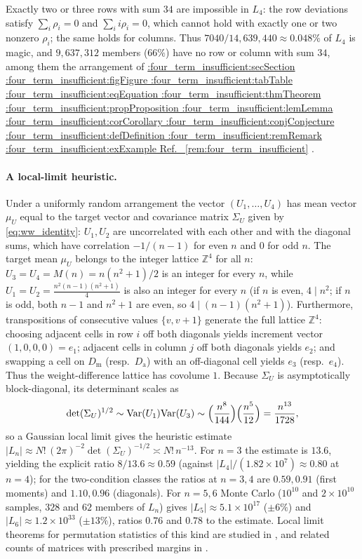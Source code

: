 \documentclass[11pt,a4paper]{article}
\makeatletter
\def\Cref@getprefix#1:#2\relax{#1}
\def\Cref@prefix@sec{sec}
\def\Cref@prefix@fig{fig}
\def\Cref@prefix@tab{tab}
\def\Cref@prefix@eq{eq}
\def\Cref@prefix@thm{thm}
\def\Cref@prefix@prop{prop}
\def\Cref@prefix@lem{lem}
\def\Cref@prefix@cor{cor}
\def\Cref@prefix@conj{conj}
\def\Cref@prefix@def{def}
\def\Cref@prefix@rem{rem}
\def\Cref@prefix@ex{ex}
\def\Cref@type@cap#1{%
  \edef\Cref@tmp{#1}%
  \ifx\Cref@tmp\Cref@prefix@sec Section%
  \else\ifx\Cref@tmp\Cref@prefix@fig Figure%
  \else\ifx\Cref@tmp\Cref@prefix@tab Table%
  \else\ifx\Cref@tmp\Cref@prefix@eq Equation%
  \else\ifx\Cref@tmp\Cref@prefix@thm Theorem%
  \else\ifx\Cref@tmp\Cref@prefix@prop Proposition%
  \else\ifx\Cref@tmp\Cref@prefix@lem Lemma%
  \else\ifx\Cref@tmp\Cref@prefix@cor Corollary%
  \else\ifx\Cref@tmp\Cref@prefix@conj Conjecture%
  \else\ifx\Cref@tmp\Cref@prefix@def Definition%
  \else\ifx\Cref@tmp\Cref@prefix@rem Remark%
  \else\ifx\Cref@tmp\Cref@prefix@ex Example%
  \else Ref.%
  \fi\fi\fi\fi\fi\fi\fi\fi\fi\fi\fi\fi
}
\DeclareRobustCommand{\Cref}[1]{%
  \begingroup
  \edef\Cref@label{#1}%
  \edef\Cref@prefix{\expandafter\Cref@getprefix\Cref@label:\relax}%
  \hyperref[#1]{\Cref@type@cap{\Cref@prefix}~\ref*{#1}}%
  \endgroup
}
\theoremstyle{plain}
\theoremstyle{definition}
\theoremstyle{remark}
\newcommand{\Z}{\mathbb{Z}}
\newcommand{\Var}{\mathrm{Var}}
\makeatother
\begin{document}
Exactly two or three rows with sum $34$ are impossible in $L_4$: the row deviations satisfy $\sum_i\rho_i=0$ and $\sum_ii\rho_i=0$, which cannot hold with exactly one or two nonzero $\rho_i$; the same holds for columns.
Thus $7040/14{,}639{,}440\approx0.048\%$ of $L_4$ is magic, and $9{,}637{,}312$ members ($66\%$) have no row or column with sum $34$, among them the arrangement of \Cref{rem:four_term_insufficient}.

\paragraph{A local-limit heuristic.}
Under a uniformly random arrangement the vector $(U_1,\dots,U_4)$ has mean vector $\mu_U$ equal to the target vector and covariance matrix $\Sigma_U$ given by \eqref{eq:ww_identity}: $U_1,U_2$ are uncorrelated with each other and with the diagonal sums, which have correlation $-1/(n-1)$ for even $n$ and $0$ for odd $n$.
The target mean $\mu_U$ belongs to the integer lattice $\Z^4$ for all $n$: $U_3=U_4=M(n)=n(n^2+1)/2$ is an integer for every $n$, while $U_1=U_2=\frac{n^2(n-1)(n^2+1)}{4}$ is also an integer for every $n$ (if $n$ is even, $4\mid n^2$; if $n$ is odd, both $n-1$ and $n^2+1$ are even, so $4\mid (n-1)(n^2+1)$).
Furthermore, transpositions of consecutive values $\{v, v+1\}$ generate the full lattice $\Z^4$: choosing adjacent cells in row $i$ off both diagonals yields increment vector $(1,0,0,0)=e_1$; adjacent cells in column $j$ off both diagonals yields $e_2$; and swapping a cell on $D_{\mathrm m}$ (resp.\ $D_{\mathrm a}$) with an off-diagonal cell yields $e_3$ (resp.\ $e_4$). Thus the weight-difference lattice has covolume $1$.
Because $\Sigma_U$ is asymptotically block-diagonal, its determinant scales as
\begin{equation}
\det(\Sigma_U)^{1/2}\sim\Var(U_1)\Var(U_3)\sim\Bigl(\frac{n^8}{144}\Bigr)\Bigl(\frac{n^5}{12}\Bigr)=\frac{n^{13}}{1728},
\label{eq:det_sigma_scaling}
\end{equation}
so a Gaussian local limit gives the heuristic estimate $|L_n|\approx N!\,(2\pi)^{-2}\det(\Sigma_U)^{-1/2}\asymp N!\,n^{-13}$.
For $n=3$ the estimate is $13.6$, yielding the explicit ratio $8/13.6\approx0.59$ (against $|L_4|/(1.82\times10^7)\approx0.80$ at $n=4$); for the two-condition classes the ratios at $n=3,4$ are $0.59,0.91$ (first moments) and $1.10,0.96$ (diagonals).
For $n=5,6$ Monte Carlo ($10^{10}$ and $2\times10^{10}$ samples, $328$ and $62$ members of $L_n$) gives $|L_5|\approx5.1\times10^{17}$ ($\pm6\%$) and $|L_6|\approx1.2\times10^{33}$ ($\pm13\%$), ratios $0.76$ and $0.78$ to the estimate.
Local limit theorems for permutation statistics of this kind are studied in \cite{kuperberg2017probabilistic,eberhard2019additive}, and related counts of matrices with prescribed margins in \cite{canfield2010asymptotic}.
\end{document}
